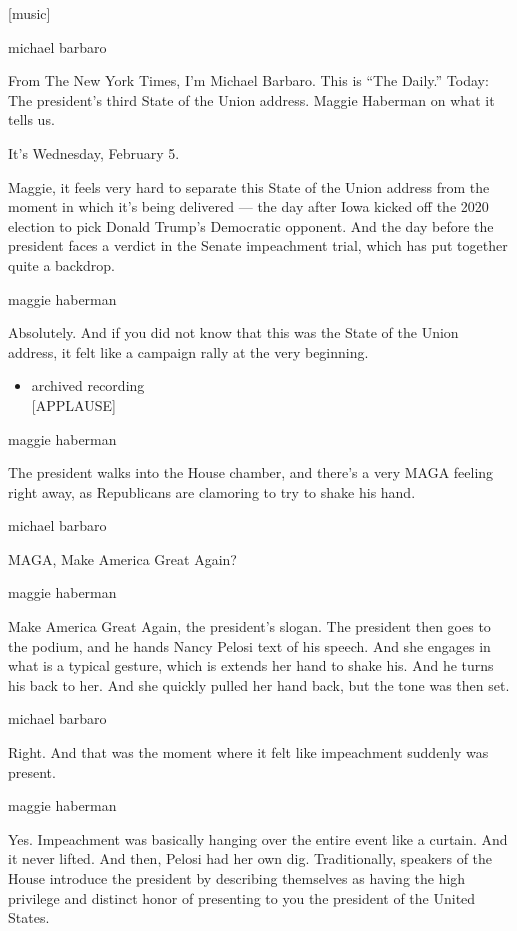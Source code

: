 {[}music{]}

michael barbaro

From The New York Times, I'm Michael Barbaro. This is ``The Daily.''
Today: The president's third State of the Union address. Maggie Haberman
on what it tells us.

It's Wednesday, February 5.

Maggie, it feels very hard to separate this State of the Union address
from the moment in which it's being delivered --- the day after Iowa
kicked off the 2020 election to pick Donald Trump's Democratic opponent.
And the day before the president faces a verdict in the Senate
impeachment trial, which has put together quite a backdrop.

maggie haberman

Absolutely. And if you did not know that this was the State of the Union
address, it felt like a campaign rally at the very beginning.

\begin{itemize}
\tightlist
\item
  archived recording\\
  {[}APPLAUSE{]}
\end{itemize}

maggie haberman

The president walks into the House chamber, and there's a very MAGA
feeling right away, as Republicans are clamoring to try to shake his
hand.

michael barbaro

MAGA, Make America Great Again?

maggie haberman

Make America Great Again, the president's slogan. The president then
goes to the podium, and he hands Nancy Pelosi text of his speech. And
she engages in what is a typical gesture, which is extends her hand to
shake his. And he turns his back to her. And she quickly pulled her hand
back, but the tone was then set.

michael barbaro

Right. And that was the moment where it felt like impeachment suddenly
was present.

maggie haberman

Yes. Impeachment was basically hanging over the entire event like a
curtain. And it never lifted. And then, Pelosi had her own dig.
Traditionally, speakers of the House introduce the president by
describing themselves as having the high privilege and distinct honor of
presenting to you the president of the United States.

